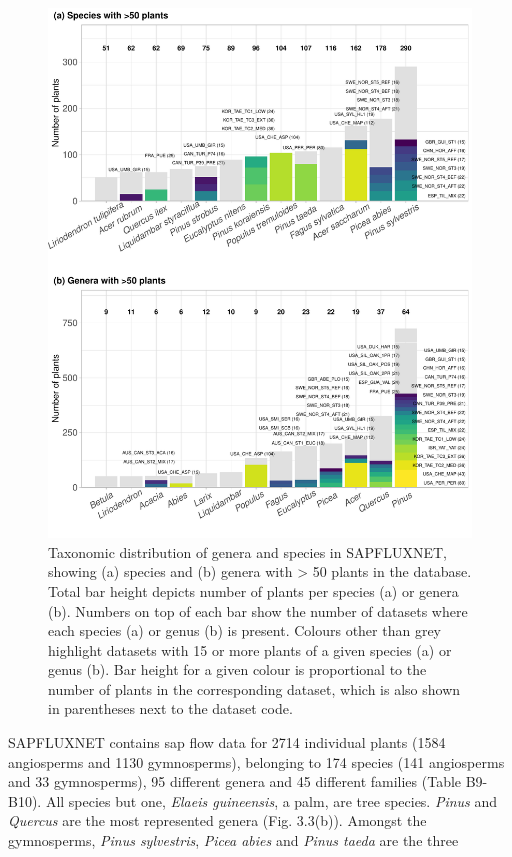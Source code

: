 \documentclass[11pt,twoside]{reedthesis}
\begin{document}
\setlength{\abovecaptionskip}{0pt}
\begin{figure}[H]

{\centering \includegraphics[width=0.8\linewidth]{figure/CH3/Figure3} 

}

\caption[Taxonomic distribution of genera and species in SAPFLUXNET.]{Taxonomic distribution of genera and species in SAPFLUXNET, showing (a) species and (b) genera with > 50 plants in the database. Total bar height depicts number of plants per species (a) or genera (b). Numbers on top of each bar show the number of datasets where each species (a) or genus (b) is present. Colours other than grey highlight datasets with 15 or more plants of a given species (a) or genus (b). Bar height for a given colour is proportional to the number of plants in the corresponding dataset, which is also shown in parentheses next to the dataset code.}\label{fig:Ch2plot3}
\end{figure}
SAPFLUXNET contains sap flow data for 2714 individual plants (1584
angiosperms and 1130 gymnosperms), belonging to 174 species (141
angiosperms and 33 gymnosperms), 95 different genera and 45 different
families (Table B9-B10). All species but one, \emph{Elaeis guineensis},
a palm, are tree species. \emph{Pinus} and \emph{Quercus} are the most
represented genera (Fig. 3.3(b)). Amongst the gymnosperms, \emph{Pinus
sylvestris}, \emph{Picea abies} and \emph{Pinus taeda} are the three
\end{document}
